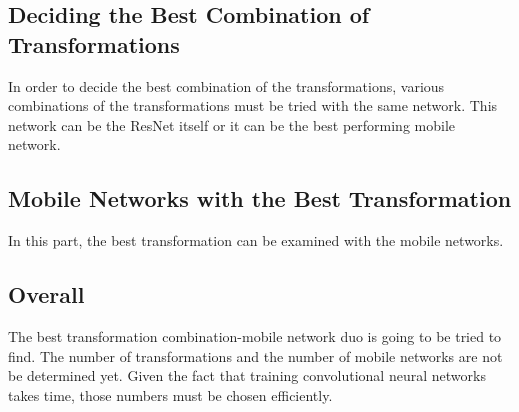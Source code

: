 \documentclass[conference]{IEEEtran}
\begin{document}
\subsection{Deciding the Best Combination of Transformations}
In order to decide the best combination of the transformations, various combinations of the transformations must be tried with the same network. This network can be the ResNet itself or it can be the best performing mobile network. 

\subsection{Mobile Networks with the Best Transformation}
In this part, the best transformation can be examined with the mobile networks. 


\subsection{Overall}\label{SCM}
The best transformation combination-mobile network duo is going to be tried to find. The number of transformations and the number of mobile networks are not be determined yet. Given the fact that training convolutional neural networks takes time, those numbers must be chosen efficiently.



\vspace{12pt}
\end{document}
